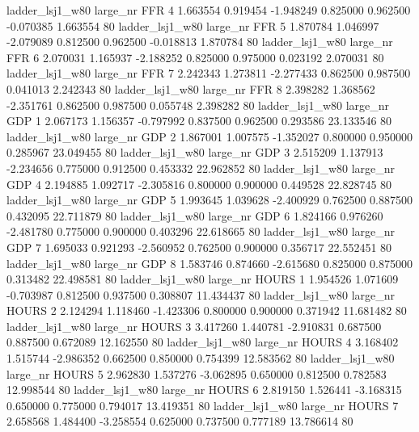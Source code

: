     ladder_lsj1_w80   large_nr      FFR                 4  1.663554  0.919454  -1.948249 0.825000 0.962500 -0.070385    1.663554 80
    ladder_lsj1_w80   large_nr      FFR                 5  1.870784  1.046997  -2.079089 0.812500 0.962500 -0.018813    1.870784 80
    ladder_lsj1_w80   large_nr      FFR                 6  2.070031  1.165937  -2.188252 0.825000 0.975000  0.023192    2.070031 80
    ladder_lsj1_w80   large_nr      FFR                 7  2.242343  1.273811  -2.277433 0.862500 0.987500  0.041013    2.242343 80
    ladder_lsj1_w80   large_nr      FFR                 8  2.398282  1.368562  -2.351761 0.862500 0.987500  0.055748    2.398282 80
    ladder_lsj1_w80   large_nr      GDP                 1  2.067173  1.156357  -0.797992 0.837500 0.962500  0.293586   23.133546 80
    ladder_lsj1_w80   large_nr      GDP                 2  1.867001  1.007575  -1.352027 0.800000 0.950000  0.285967   23.049455 80
    ladder_lsj1_w80   large_nr      GDP                 3  2.515209  1.137913  -2.234656 0.775000 0.912500  0.453332   22.962852 80
    ladder_lsj1_w80   large_nr      GDP                 4  2.194885  1.092717  -2.305816 0.800000 0.900000  0.449528   22.828745 80
    ladder_lsj1_w80   large_nr      GDP                 5  1.993645  1.039628  -2.400929 0.762500 0.887500  0.432095   22.711879 80
    ladder_lsj1_w80   large_nr      GDP                 6  1.824166  0.976260  -2.481780 0.775000 0.900000  0.403296   22.618665 80
    ladder_lsj1_w80   large_nr      GDP                 7  1.695033  0.921293  -2.560952 0.762500 0.900000  0.356717   22.552451 80
    ladder_lsj1_w80   large_nr      GDP                 8  1.583746  0.874660  -2.615680 0.825000 0.875000  0.313482   22.498581 80
    ladder_lsj1_w80   large_nr    HOURS                 1  1.954526  1.071609  -0.703987 0.812500 0.937500  0.308807   11.434437 80
    ladder_lsj1_w80   large_nr    HOURS                 2  2.124294  1.118460  -1.423306 0.800000 0.900000  0.371942   11.681482 80
    ladder_lsj1_w80   large_nr    HOURS                 3  3.417260  1.440781  -2.910831 0.687500 0.887500  0.672089   12.162550 80
    ladder_lsj1_w80   large_nr    HOURS                 4  3.168402  1.515744  -2.986352 0.662500 0.850000  0.754399   12.583562 80
    ladder_lsj1_w80   large_nr    HOURS                 5  2.962830  1.537276  -3.062895 0.650000 0.812500  0.782583   12.998544 80
    ladder_lsj1_w80   large_nr    HOURS                 6  2.819150  1.526441  -3.168315 0.650000 0.775000  0.794017   13.419351 80
    ladder_lsj1_w80   large_nr    HOURS                 7  2.658568  1.484400  -3.258554 0.625000 0.737500  0.777189   13.786614 80
